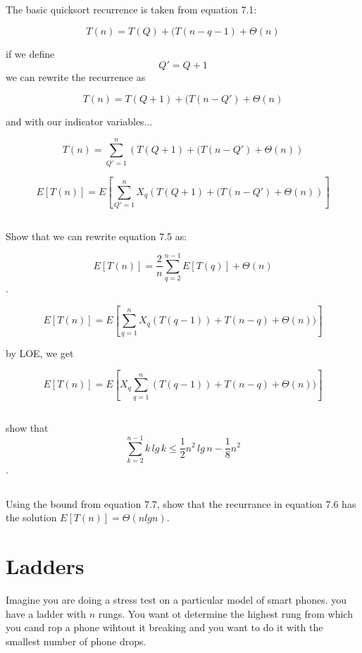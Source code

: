 \documentclass[titlepage]{article}\usepackage[]{graphicx}\usepackage[]{color}
\begin{document}
The basic quicksort recurrence is taken from equation 7.1:

\[ T(n) = T(Q) + (T(n-q-1) + \Theta(n) \]

if we define 
\[ Q' = Q + 1 \]
we can rewrite the recurrence as 

\[ T(n) = T(Q+1) + (T(n-Q') + \Theta(n) \]

and with our indicator variables...

\[ T(n) = \sum_{Q' = 1}^{n} \left( T(Q+1) + (T(n-Q') + \Theta(n) \right) \]

\[ E\left[T(n)\right] = E\left[ \sum_{Q' = 1}^{n} X_q \left( T(Q+1) + (T(n-Q') + \Theta(n) \right) \right] \]



\subsection{}
Show that we can rewrite equation 7.5 as:

\[ E[T(n) ] = \frac{2}{n} \sum_{q=2}^{n-1} E[T(q)] + \Theta(n) \].


\[ E[T(n)] = E \left[ \sum_{q=1}^{n} X_q (T(q-1)) + T(n-q) + \Theta(n))\right] \]

by LOE, we get

\[ E[T(n)] = E \left[ X_q \sum_{q=1}^{n} (T(q-1)) + T(n-q) + \Theta(n))\right] \]



\subsection{}
show that 
\[ \sum_{k=2}^{n-1}k\, lg\, k \leq \frac{1}{2} n^2\, lg\, n - \frac{1}{8} n^2 \].

\subsection{}

Using the bound from equation 7.7, show that the recurrance in equation 7.6 has
the solution $E[T(n)] = \Theta(n lg n)$. 




\section{ Ladders }
  Imagine you are doing a stress test on a particular model of smart phones. you
  have a ladder with $n$ rungs. You want ot determine the highest rung from which
  you cand rop a phone wihtout it breaking and you want to do it with the
smallest number of phone drops. 
\end{document}
